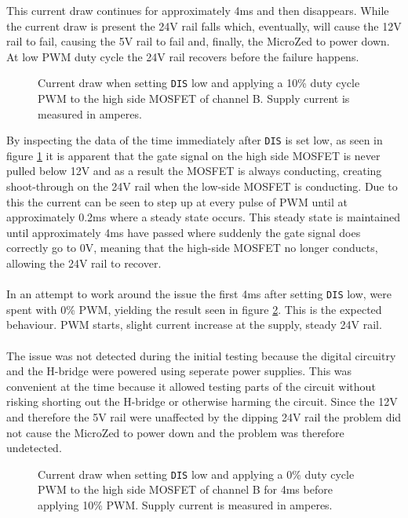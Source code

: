 This current draw continues for approximately 4ms and then disappears.
While the current draw is present the 24V rail falls which, eventually, will cause the 12V rail to fail, causing the 5V rail to fail and, finally, the MicroZed to power down.
At low PWM duty cycle the 24V rail recovers before the failure happens.

\begin{figure}[h]
	\centering
	
	\caption{Current draw when setting \texttt{DIS} low and applying a 10\% duty cycle PWM to the high side MOSFET of channel B. Supply current is measured in amperes.}
	\label{fig:current_w_load_closeup}
\end{figure}

By inspecting the data of the time immediately after \texttt{DIS} is set low, as seen in figure \ref{fig:current_w_load_closeup} it is apparent that the gate signal on the high side MOSFET is never pulled below 12V and as a result the MOSFET is always conducting, creating shoot-through on the 24V rail when the low-side MOSFET is conducting.
Due to this the current can be seen to step up at every pulse of PWM until at approximately 0.2ms where a steady state occurs.
This steady state is maintained until approximately 4ms have passed where suddenly the gate signal does correctly go to 0V, meaning that the high-side MOSFET no longer conducts, allowing the 24V rail to recover.
\\~\\
In an attempt to work around the issue the first 4ms after setting \texttt{DIS} low, were spent with 0\% PWM, yielding the result seen in figure \ref{fig:current_w_load_slow}.
This is the expected behaviour.
PWM starts, slight current increase at the supply, steady 24V rail.
\\~\\
The issue was not detected during the initial testing because the digital circuitry and the H-bridge were powered using seperate power supplies.
This was convenient at the time because it allowed testing parts of the circuit without risking shorting out the H-bridge or otherwise harming the circuit.
Since the 12V and therefore the 5V rail were unaffected by the dipping 24V rail the problem did not cause the MicroZed to power down and the problem was therefore undetected. 

\begin{figure}[h]
	\centering
	
	\caption{Current draw when setting \texttt{DIS} low and applying a 0\% duty cycle PWM to the high side MOSFET of channel B for 4ms before applying 10\% PWM. Supply current is measured in amperes.}
	\label{fig:current_w_load_slow}
\end{figure}

